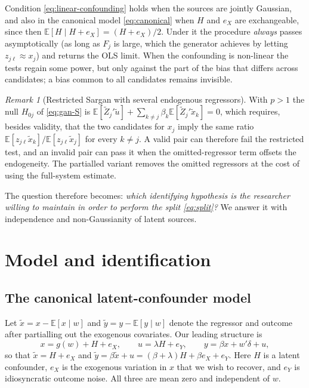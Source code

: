 \documentclass[11pt]{article}
\theoremstyle{definition}
\theoremstyle{remark}
\newtheorem{remark}{Remark}
\newcommand{\E}{\mathbb{E}}
\newcommand{\tx}{\tilde{x}}
\newcommand{\ty}{\tilde{y}}
\begin{document}
Condition \eqref{eq:linear-confounding} holds when the sources are jointly Gaussian, and also in the
canonical model \eqref{eq:canonical} when $H$ and $e_X$ are exchangeable, since then
$\E[H\mid H+e_X]=(H+e_X)/2$. Under it the procedure \emph{always} passes asymptotically (as long as
$F_j$ is large, which the generator achieves by letting $z_{j\ell}\approx x_j$) and returns the OLS
limit. When the confounding is non-linear the tests regain some power, but only against the part of
the bias that differs across candidates; a bias common to all candidates remains invisible.

\begin{remark}[Restricted Sargan with several endogenous regressors]\label{rem:restricted}
With $p>1$ the null $H_{0j}$ of \eqref{eq:gan-S} is
$\E[\tilde Z_j'\tilde u]+\sum_{k\ne j}\beta_k\E[\tilde Z_j'\tilde x_k]=0$, which requires, besides
validity, that the two candidates for $x_j$ imply the same ratio
$\E[z_{j\ell}\tilde x_k]/\E[z_{j\ell}\tilde x_j]$ for every $k\ne j$. A valid pair can therefore fail
the restricted test, and an invalid pair can pass it when the omitted-regressor term offsets the
endogeneity. The partialled variant removes the omitted regressors at the cost of using the
full-system estimate.
\end{remark}

The question therefore becomes: \emph{which identifying hypothesis is the researcher willing to
maintain in order to perform the split \eqref{eq:split}?} We answer it with independence and
non-Gaussianity of latent sources.

\section{Model and identification}\label{sec:identification}

\subsection{The canonical latent-confounder model}

Let $\tx = x - \E[x\mid w]$ and $\ty = y - \E[y\mid w]$ denote the regressor and outcome after
partialling out the exogenous covariates. Our leading structure is
\begin{equation}\label{eq:canonical}
  x = g(w) + H + e_X, \qquad u = \lambda H + e_Y, \qquad y = \beta x + w'\delta + u,
\end{equation}
so that $\tx = H + e_X$ and $\ty = \beta\tx + u = (\beta+\lambda)H + \beta e_X + e_Y$. Here $H$ is a
latent confounder, $e_X$ is the exogenous variation in $x$ that we wish to recover, and $e_Y$ is
idiosyncratic outcome noise. All three are mean zero and independent of $w$.
\end{document}
